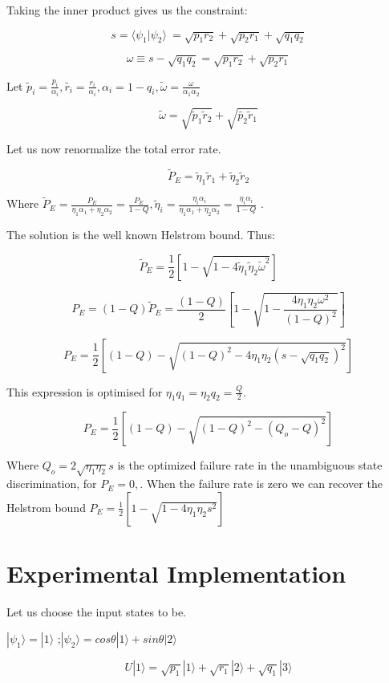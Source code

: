 \documentclass[12pt,oneside,english,reqno]{amsbook}
\numberwithin{section}{chapter}
\numberwithin{equation}{section}
\numberwithin{figure}{section}
\begin{document}
Taking the inner product gives us the constraint:

\[
s=\langle\psi_{1}|\psi_{2}\rangle\ =\sqrt{p_{1}r_{2}}+\sqrt{p_{2}r_{1}}+\sqrt{q_{1}q_{2}}
\]


\[
\omega\equiv s-\sqrt{q_{1}q_{2}}=\sqrt{p_{1}r_{2}}+\sqrt{p_{2}r_{1}}
\]


Let $\tilde{p}_{i}=\frac{p_{i}}{\alpha_{i}},\tilde{r_{i}}=\frac{r_{i}}{\alpha_{i}},\alpha_{i}=1-q_{i},\tilde{\omega}=\frac{\omega}{\alpha_{1}\alpha_{2}}$ 

\[
\tilde{\omega}=\sqrt{\tilde{p}_{1}\tilde{r}_{2}}+\sqrt{\tilde{p_{2}}\tilde{r}_{1}}
\]


Let us now renormalize the total error rate.

\[
\tilde{P}_{E}=\tilde{\eta}_{1}\tilde{r}_{1}+\tilde{\eta}_{2}\tilde{r}_{2}
\]


Where $\tilde{P}_{E}=\frac{P_{E}}{\eta_{1}\alpha_{1}+\eta_{2}\alpha_{2}}=\frac{P_{E}}{1-Q},\tilde{\eta}_{i}=\frac{\eta_{i}\alpha_{i}}{\eta_{1}\alpha_{1}+\eta_{2}\alpha_{2}}=\frac{\eta_{i}\alpha_{i}}{1-Q}$
. 

The solution is the well known Helstrom bound. Thus:

\[
\tilde{P}_{E}=\frac{1}{2}[1-\sqrt{1-4\tilde{\eta}_{1}\tilde{\eta}_{2}\tilde{\omega}^{2}}]
\]


\[
P_{E}=(1-Q)\tilde{P}_{E}=\frac{(1-Q)}{2}[1-\sqrt{1-\frac{4\eta_{1}\eta_{2}\omega^{2}}{(1-Q)^{2}}}]
\]


\[
P_{E}=\frac{1}{2}[(1-Q)-\sqrt{(1-Q)^{2}-4\eta_{1}\eta_{2}(s-\sqrt{q_{1}q_{2}})^{2}}]
\]


This expression is optimised for $\eta_{1}q_{1}=\eta_{2}q_{2}=\frac{Q}{2}$.

\[
P_{E}=\frac{1}{2}[(1-Q)-\sqrt{(1-Q)^{2}-(Q_{o}-Q)^{2}}]
\]


Where $Q_{o}=2\sqrt{\eta_{1}\eta_{2}}s$ is the optimized failure
rate in the unambiguous state discrimination, for $P_{E}=0,$. When
the failure rate is zero we can recover the Helstrom bound $P_{E}=\frac{1}{2}[1-\sqrt{1-4\eta_{1}\eta_{2}s^{2}}]$


\section{Experimental Implementation}

Let us choose the input states to be.

$|\psi_{1}\rangle=|1\rangle$ ;$|\psi_{2}\rangle=cos\theta|1\rangle+sin\theta|2\rangle$

\begin{equation}
U|1\rangle=\sqrt{p_{1}}|1\rangle+\sqrt{r_{1}}|2\rangle+\sqrt{q_{1}}|3\rangle
\end{equation}
\end{document}
